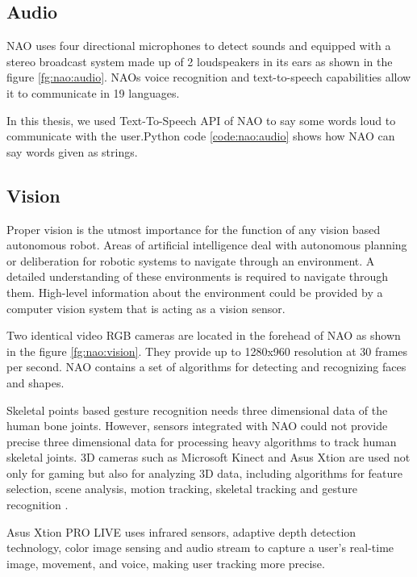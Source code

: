  \label{code:nao:motion}

\subsection{Audio} NAO uses four directional microphones to detect sounds and equipped with a stereo broadcast system made up of 2 loudspeakers in its ears as shown in the figure \ref{fg:nao:audio}. NAOs voice recognition and text-to-speech capabilities allow it to communicate in 19 languages. 

 

In this thesis, we used Text-To-Speech API of NAO to say some words loud to communicate with the user.Python code \ref{code:nao:audio} shows how NAO can say words given as strings.

 \label{code:nao:audio}

\subsection{Vision}
Proper vision is the utmost importance for the function of any vision based autonomous robot. Areas of artificial intelligence deal with autonomous planning or deliberation for robotic systems to navigate through an environment. A detailed understanding of these environments is required to navigate through them. High-level information about the environment could be provided by a computer vision system that is acting as a vision sensor.

 Two identical video RGB cameras are located in the forehead of NAO as shown in the figure \ref{fg:nao:vision}. They provide up to 1280x960 resolution at 30 frames per second. NAO contains a set of algorithms for detecting and recognizing faces and shapes.



Skeletal points based gesture recognition needs three dimensional data of the human bone joints. However, sensors integrated with NAO could not provide precise three dimensional data for processing heavy algorithms to track human skeletal joints. 3D cameras such as Microsoft Kinect and Asus Xtion are used not only for gaming but also for analyzing 3D data, including algorithms for feature selection, scene analysis, motion tracking, skeletal tracking and gesture recognition \cite{12}. 

Asus Xtion PRO LIVE uses infrared sensors, adaptive depth detection technology, color image sensing and audio stream to capture a user's real-time image, movement, and voice, making user tracking more precise. 

